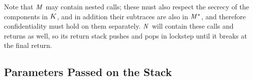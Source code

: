 \documentclass[acmsmall,review,anonymous]{acmart}\settopmatter{printfolios=true,printccs=false,printacmref=false}
\begin{document}
\vspace{\belowdisplayskip}

Note that \(\mathit{M}\) may contain nested calls; these must also respect the secrecy
of the components in \(K\), and in addition their subtraces are also in
\(\mathit{M}^*\), and therefore confidentiality must hold on them separately. \(\mathit{N}\)
will contain these calls and returns as well, so its return stack pushes and pops
in lockstep until it breaks at the final return.

\subsection{Parameters Passed on the Stack}

\newcommand{\mainpassc}{magenta}
\end{document}
